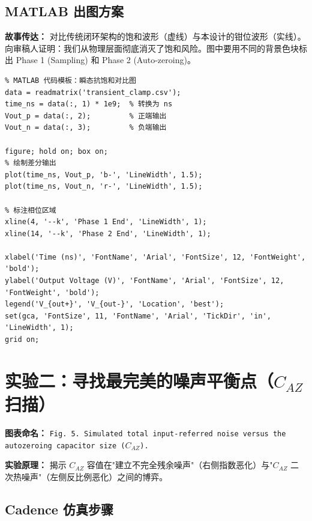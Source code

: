 \documentclass[11pt,a4paper,UTF8]{ctexart}
\begin{document}
\subsection{MATLAB 出图方案}

\textbf{故事传达：} 对比传统闭环架构的饱和波形（虚线）与本设计的钳位波形（实线）。向审稿人证明：我们从物理层面彻底消灭了饱和风险。图中要用不同的背景色块标出 Phase 1 (Sampling) 和 Phase 2 (Auto-zeroing)。

\begin{lstlisting}
% MATLAB 代码模板：瞬态抗饱和对比图
data = readmatrix('transient_clamp.csv');
time_ns = data(:, 1) * 1e9;  % 转换为 ns
Vout_p = data(:, 2);         % 正端输出
Vout_n = data(:, 3);         % 负端输出

figure; hold on; box on;
% 绘制差分输出
plot(time_ns, Vout_p, 'b-', 'LineWidth', 1.5);
plot(time_ns, Vout_n, 'r-', 'LineWidth', 1.5);

% 标注相位区域
xline(4, '--k', 'Phase 1 End', 'LineWidth', 1);
xline(14, '--k', 'Phase 2 End', 'LineWidth', 1);

xlabel('Time (ns)', 'FontName', 'Arial', 'FontSize', 12, 'FontWeight', 'bold');
ylabel('Output Voltage (V)', 'FontName', 'Arial', 'FontSize', 12, 'FontWeight', 'bold');
legend('V_{out+}', 'V_{out-}', 'Location', 'best');
set(gca, 'FontSize', 11, 'FontName', 'Arial', 'TickDir', 'in', 'LineWidth', 1);
grid on;
\end{lstlisting}

\section{实验二：寻找最完美的噪声平衡点（$C_{AZ}$ 扫描）}

\textbf{图表命名：} \texttt{Fig. 5. Simulated total input-referred noise versus the autozeroing capacitor size ($C_{AZ}$).}

\textbf{实验原理：} 揭示 $C_{AZ}$ 容值在"建立不完全残余噪声"（右侧指数恶化）与"$C_{AZ}$ 二次热噪声"（左侧反比例恶化）之间的博弈。

\subsection{Cadence 仿真步骤}
\end{document}
